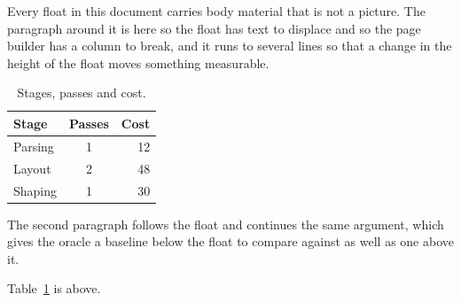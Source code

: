 \documentclass{article}
\begin{document}
Every float in this document carries body material that is not a
picture. The paragraph around it is here so the float has text to displace and
so the page builder has a column to break, and it runs to several lines so that
a change in the height of the float moves something measurable.

\begin{table}[h]
\centering
\begin{tabular}{|l|c|r|}
\hline
Stage & Passes & Cost \\
\hline
Parsing & 1 & 12 \\
Layout & 2 & 48 \\
Shaping & 1 & 30 \\
\hline
\end{tabular}
\caption{Stages, passes and cost.}
\label{tab:stages}
\end{table}

The second paragraph follows the float and continues the same
argument, which gives the oracle a baseline below the float to compare against
as well as one above it.

Table~\ref{tab:stages} is above.
\end{document}
